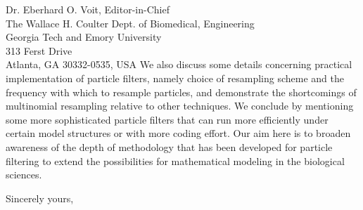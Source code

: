 \documentclass[ucsb,pstat,12pt]{ucletter}
\begin{document}
\begin{letter}{Dr. Eberhard O. Voit, Editor-in-Chief \\
The Wallace H. Coulter Dept. of Biomedical, Engineering \\
Georgia Tech and Emory University \\
313 Ferst Drive \\
Atlanta, GA 30332-0535, USA
}
We also discuss some details concerning practical implementation of particle filters, namely choice of resampling scheme and the frequency with which to resample particles, and demonstrate the shortcomings of multinomial resampling relative to other techniques. We conclude by mentioning some more sophisticated particle filters that can run more efficiently under certain model structures or with more coding effort. Our aim here is to broaden awareness of the depth of methodology that has been developed for particle filtering to extend the possibilities for mathematical modeling in the biological sciences.

\closing{Sincerely yours,}

\end{letter}
\end{document}

